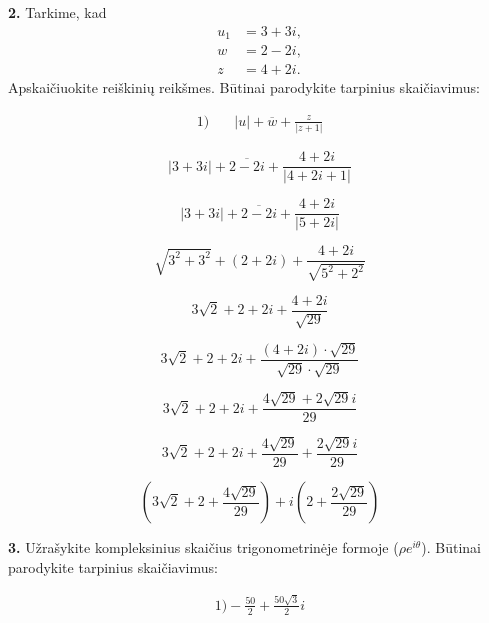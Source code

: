 \documentclass{article}
\begin{document}
\textbf{2.} Tarkime, kad
\begin{align*}
    u_1&=3+3i,\\
    w&=2-2i,\\
    z&=4+2i.
\end{align*}Apskaičiuokite reiškinių reikšmes. Būtinai parodykite tarpinius skaičiavimus:

\begin{align}
\text{1)}\quad & |u|+\overline{w}+\frac{z}{|z+1|}\nonumber
\end{align}


\begin{equation}
|3+3i|+\overline{2-2i}+\frac{4+2i}{|4+2i+1|}\tag{1}
\end{equation}

\begin{equation}
|3+3i|+\overline{2-2i}+\frac{4+2i}{|5+2i|}\tag{2}
\end{equation}

\begin{equation}
\sqrt{3^2+3^2}+(2+2i)+\frac{4+2i}{\sqrt{5^2+2^2}}\tag{3}
\end{equation}

\begin{equation}
3\sqrt{2}+2+2i+\frac{4+2i}{\sqrt{29}}\tag{4}
\end{equation}

\begin{equation}
3\sqrt{2}+2+2i+\frac{(4+2i) \cdot \sqrt{29}}{\sqrt{29} \cdot \sqrt{29}}\tag{5}
\end{equation}

\begin{equation}
3\sqrt{2}+2+2i+\frac{4\sqrt{29}+2\sqrt{29}i}{29}\tag{6}
\end{equation}

\begin{equation}
3\sqrt{2}+2+2i+\frac{4\sqrt{29}}{29}+\frac{2\sqrt{29}i}{29}\tag{7}
\end{equation}

\begin{equation*}
(3\sqrt{2}+2+\frac{4\sqrt{29}}{29})+i(2+\frac{2\sqrt{29}}{29})
\end{equation*}


\pagebreak 

\textbf{3.} Užrašykite kompleksinius skaičius trigonometrinėje formoje (\(\rho e^{i \theta}\)). Būtinai parodykite tarpinius skaičiavimus:

\begin{align}
\text{1)}-\frac{50}{2}+\frac{50\sqrt{3}}{2}i \nonumber
\end{align}
\end{document}
